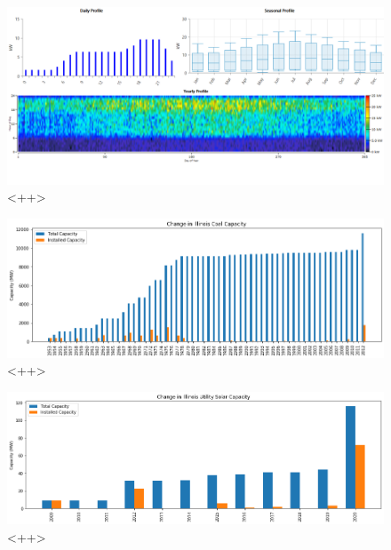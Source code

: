 \begin{figure}[ht]
	\centering
	\includegraphics[width=\columnwidth]{./img/homer_illinois_loadprofile.png}
	\caption{<++>} 
        \label{fig:<++>}
\end{figure}


\begin{figure}[ht]
	\centering
	\includegraphics[width=\columnwidth]{./img/annual_installed_cap_coal.png}
	\caption{<++>}
	\label{fig:<++>}
\end{figure}


\begin{figure}[ht]
	\centering
	\includegraphics[width=\columnwidth]{./img/annual_installed_cap_utilityPV.png}
	\caption{<++>}
	\label{fig:<++>}
\end{figure}



